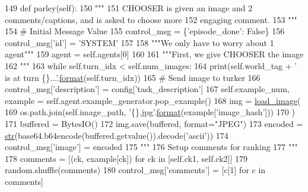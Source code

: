\begin{DoxyCode}
149     \textcolor{keyword}{def }parley(self):
150         \textcolor{stringliteral}{"""}
151 \textcolor{stringliteral}{        CHOOSER is given an image and 2 comments/captions, and is asked to choose more}
152 \textcolor{stringliteral}{        engaging comment.}
153 \textcolor{stringliteral}{        """}
154         \textcolor{comment}{# Initial Message Value}
155         control\_msg = \{\textcolor{stringliteral}{'episode\_done'}: \textcolor{keyword}{False}\}
156         control\_msg[\textcolor{stringliteral}{'id'}] = \textcolor{stringliteral}{'SYSTEM'}
157 
158         \textcolor{stringliteral}{"""We only have to worry about 1 agent"""}
159         agent = self.agents[0]
160 
161         \textcolor{stringliteral}{"""First, we give CHOOSER the image}
162 \textcolor{stringliteral}{        """}
163         \textcolor{keywordflow}{while} self.turn\_idx < self.num\_images:
164             print(self.world\_tag + \textcolor{stringliteral}{' is at turn \{\}...'}.\hyperlink{namespaceparlai_1_1chat__service_1_1services_1_1messenger_1_1shared__utils_a32e2e2022b824fbaf80c747160b52a76}{format}(self.turn\_idx))
165             \textcolor{comment}{# Send image to turker}
166             control\_msg[\textcolor{stringliteral}{'description'}] = config[\textcolor{stringliteral}{'task\_description'}]
167             self.example\_num, example = self.agent.example\_generator.pop\_example()
168             img = \hyperlink{namespacepersonality__captions_1_1worlds_a2863737d97a8e8c5a1ebe9029d0d2293}{load\_image}(
169                 os.path.join(self.image\_path, \textcolor{stringliteral}{'\{\}.jpg'}.\hyperlink{namespaceparlai_1_1chat__service_1_1services_1_1messenger_1_1shared__utils_a32e2e2022b824fbaf80c747160b52a76}{format}(example[\textcolor{stringliteral}{'image\_hash'}]))
170             )
171             buffered = BytesIO()
172             img.save(buffered, format=\textcolor{stringliteral}{"JPEG"})
173             encoded = \hyperlink{namespacegenerate__task__READMEs_a5b88452ffb87b78c8c85ececebafc09f}{str}(base64.b64encode(buffered.getvalue()).decode(\textcolor{stringliteral}{'ascii'}))
174             control\_msg[\textcolor{stringliteral}{'image'}] = encoded
175             \textcolor{stringliteral}{"""}
176 \textcolor{stringliteral}{                Setup comments for ranking}
177 \textcolor{stringliteral}{            """}
178             comments = [(ck, example[ck]) \textcolor{keywordflow}{for} ck \textcolor{keywordflow}{in} [self.ck1, self.ck2]]
179             random.shuffle(comments)
180             control\_msg[\textcolor{stringliteral}{'comments'}] = [c[1] \textcolor{keywordflow}{for} c \textcolor{keywordflow}{in} comments]

\end{DoxyCode}
